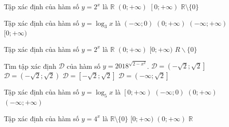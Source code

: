 \begin{ex}%
	Tập xác định của  hàm số $y=2^x$ là
	 \choice
		 {\True $\mathbb{R}$}
		{$\left(0;+\infty \right)$} 
		 {$\left[0;+\infty \right)$}
		{$\mathbb{R}\setminus \{0\}$} 
\end{ex}

\begin{ex}%
	Tập xác định  của hàm số $y=\log_3x$ là
	 \choice
		{$(-\infty;0)$} 
		 {\True $(0;+\infty)$}
		 {$(-\infty;+\infty)$}
		{$[0;+\infty)$} 
\end{ex}

\begin{ex}%
	Tập xác  định của hàm số $y=2^x$ là
	\choice 
		 {\True $\mathbb{R}$}
		 {$(0;+\infty)$}
		 {$[0;+\infty)$}
		{$R \backslash\{0\}$} 
\end{ex}

\begin{ex}%
	Tìm tập xác định $\mathscr{D}$ của hàm  số $y=2018^{\sqrt{2-x^2}}$.
	\choice 
		 {$\mathscr{D}=\left(-\sqrt{2};\sqrt{2}\right]$}
		 {$\mathscr{D}=\left(-\sqrt{2};\sqrt{2}\right)$}
		{\True $\mathscr{D}=\left[-\sqrt{2};\sqrt{2}\right]$} 
		 {$\mathscr{D}=\left(-\infty;\sqrt{2}\right]$}
\end{ex}

\begin{ex}%
	Tập xác định của hàm số $y=\log_5x$  là
	 \choice
		 {$\left[0;+\infty\right)$}
		 {$\left(- \infty; 0\right)$}
		{\True $\left(0;+\infty\right)$} 
		{$\left(- \infty;+\infty\right)$} 
\end{ex}

\begin{ex}%
	Tập xác định  của hàm số $y=4^x$ là
	 \choice
		{$\mathbb{R}\setminus\{0\}$} 
		 {$[0;+\infty)$}
		 {$(0;+\infty)$}
		{\True $\mathbb{R}$} 
\end{ex}

